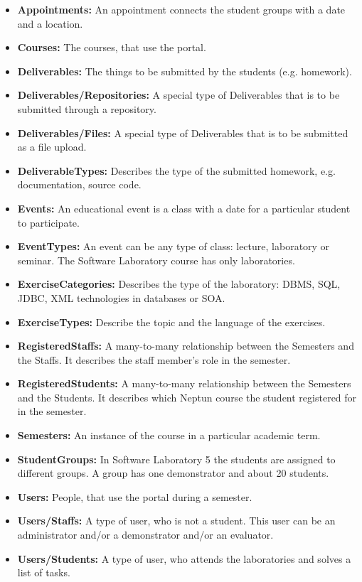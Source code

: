 \begin{itemize}
	\item \textbf{Appointments:} An appointment connects the student groups with a date and a location.
	\item \textbf{Courses:} The courses, that use the portal.
	\item \textbf{Deliverables:} The things to be submitted by the students (e.g. homework).
	\item \textbf{Deliverables/Repositories:} A special type of Deliverables that is to be submitted through a repository.
	\item \textbf{Deliverables/Files:} A special type of Deliverables that is to be submitted as a file upload.
	\item \textbf{DeliverableTypes:} Describes the type of the submitted homework, e.g. documentation, source code. 
	\item \textbf{Events:} An educational event is a class with a date for a particular student to participate.
	\item \textbf{EventTypes:} An event can be any type of class: lecture, laboratory or seminar. The Software Laboratory course has only laboratories.
	\item \textbf{ExerciseCategories:} Describes the type of the laboratory: DBMS, SQL, JDBC, XML technologies in databases or SOA.
	\item \textbf{ExerciseTypes:} Describe the topic and the language of the exercises. 
	\item \textbf{RegisteredStaffs:} A many-to-many relationship between the Semesters and the Staffs. It describes the staff member's role in the semester.
	\item \textbf{RegisteredStudents:} A many-to-many relationship between the Semesters and the Students. It describes which Neptun course the student registered for in the semester.
	\item \textbf{Semesters:} An instance of the course in a particular academic term.
	\item \textbf{StudentGroups:} In Software Laboratory 5 the students are assigned to different groups. A group has one demonstrator and about 20 students.
	\item \textbf{Users:} People, that use the portal during a semester.
	\item \textbf{Users/Staffs:} A type of user, who is not a student. This user can be an administrator and/or a demonstrator and/or an evaluator.
	\item \textbf{Users/Students:} A type of user, who attends the laboratories and solves a list of tasks.
\end{itemize}

